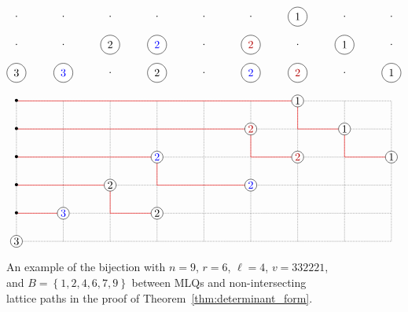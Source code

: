 \documentclass[reqno]{amsart}
\newcommand{\0}{\phantom{c}}
\newcommand{\set}[1]{\left\{ #1 \right\}}
\theoremstyle{plain}
\theoremstyle{definition}
\numberwithin{equation}{section}
\begin{document}
\begin{figure}[t]
\[
\begin{tikzpicture}[xscale=1.5,yscale=0.9]
  \begin{scope}[yshift=7cm]
    \foreach \i in {1,...,9}{
      \foreach \j in {0,1,2}{
        \node at (\i,\j){$\cdot$};
      }
    }
    \node[circle,fill=white,draw=black] at  (1, 0){$3$};
    \node[circle,fill=white,draw=black,text=blue] at  (2, 0){$3$};
    \node[circle,fill=white,draw=black] at  (4, 0){$2$};
    \node[circle,fill=white,draw=black,text=blue] at  (6, 0){$2$};
    \node[circle,fill=white,draw=black,text=darkred] at  (7, 0){$2$};
    \node[circle,fill=white,draw=black] at  (9, 0){$1$};
    \node[circle,fill=white,draw=black] at  (3, 1){$2$};
    \node[circle,fill=white,draw=black,text=blue] at  (4, 1){$2$};
    \node[circle,fill=white,draw=black,text=darkred] at  (6, 1){$2$};
    \node[circle,fill=white,draw=black] at  (8, 1){$1$};
    \node[circle,fill=white,draw=black] at  (7, 2){$1$};
  \end{scope}

  \draw[densely dotted] (1,1) grid (9,6);

  \draw[draw=red] (1,2)--(2,2);
  \draw[draw=red] (1,3)--(3,3)--(3,2)--(4,2);
  \draw[draw=red] (1,4)--(4,4)--(4,3)--(6,3);
  \draw[draw=red] (1,5)--(6,5)--(6,4)--(7,4);
  \draw[draw=red] (1,6)--(7,6)--(7,5)--(8,5)--(8,4)--(9,4);
  
  \node[circle,fill=white,draw=black,inner sep=1pt] at (1,1) {$3$};
  \node[circle,fill=white,draw=black,text=blue,inner sep=1pt] at (2,2) {$3$};
  \node[circle,fill=white,draw=black,inner sep=1pt] at (4,2) {$2$};
  \node[circle,fill=white,draw=black,inner sep=1pt] at (3,3) {$2$};
  \node[circle,fill=white,draw=black,text=blue,inner sep=1pt] at (4,4) {$2$};
  \node[circle,fill=white,draw=black,text=blue,inner sep=1pt] at (6,3) {$2$};
  \node[circle,fill=white,draw=black,text=darkred,inner sep=1pt] at (6,5) {$2$};
  \node[circle,fill=white,draw=black,text=darkred,inner sep=1pt] at (7,4) {$2$};
  \node[circle,fill=white,draw=black,inner sep=1pt] at (7,6) {$1$};
  \node[circle,fill=white,draw=black,inner sep=1pt] at (8,5) {$1$};
  \node[circle,fill=white,draw=black,inner sep=1pt] at (9,4) {$1$};

  \foreach \i in {2,...,6} {
    \node at (1,\i){\textbullet};
  }
\end{tikzpicture}
\]
\caption{An example of the bijection with $n = 9$, $r = 6$, $\ell = 4$, $v = 332221$, and $B = \set{1,2,4,6,7,9}$ between MLQs and non-intersecting lattice paths in the proof of Theorem~\ref{thm:determinant_form}.}
\label{fig:lattice_path_bijection}
\end{figure}
\end{document}
